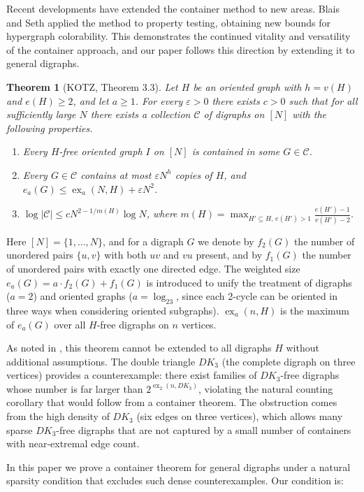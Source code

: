 \documentclass[11pt,a4paper]{article}
\newtheorem{theorem}{Theorem}[section]
\DeclareMathOperator{\ex}{ex}
\newcommand{\cC}{\mathcal{C}}
\newcommand{\eps}{\varepsilon}
\begin{document}
Recent developments have extended the container method to new areas. Blais and Seth \cite{blais2024new} applied the method to property testing, obtaining new bounds for hypergraph colorability. This demonstrates the continued vitality and versatility of the container approach, and our paper follows this direction by extending it to general digraphs.

\begin{theorem}[KOTZ, Theorem 3.3]
Let $H$ be an oriented graph with $h=v(H)$ and $e(H)\ge 2$, and let $a\ge 1$. For every $\eps>0$ there exists $c>0$ such that for all sufficiently large $N$ there exists a collection $\cC$ of digraphs on $[N]$ with the following properties.
\begin{enumerate}
\item[(a)] Every $H$-free oriented graph $I$ on $[N]$ is contained in some $G\in\cC$.
\item[(b)] Every $G\in\cC$ contains at most $\eps N^h$ copies of $H$, and $e_a(G)\le \ex_a(N,H)+\eps N^2$.
\item[(c)] $\log|\cC|\le c N^{2-1/m(H)}\log N$, where $m(H)=\max_{H'\subseteq H,\,e(H')>1}\frac{e(H')-1}{v(H')-2}$.
\end{enumerate}
\end{theorem}

Here $[N]=\{1,\dots,N\}$, and for a digraph $G$ we denote by $f_2(G)$ the number of unordered pairs $\{u,v\}$ with both $uv$ and $vu$ present, and by $f_1(G)$ the number of unordered pairs with exactly one directed edge. The weighted size $e_a(G)=a\cdot f_2(G)+f_1(G)$ is introduced to unify the treatment of digraphs ($a=2$) and oriented graphs ($a=\log_23$, since each 2-cycle can be oriented in three ways when considering oriented subgraphs). $\ex_a(n,H)$ is the maximum of $e_a(G)$ over all $H$-free digraphs on $n$ vertices.

As noted in \cite{KUH2017}, this theorem cannot be extended to all digraphs $H$ without additional assumptions. The double triangle $DK_3$ (the complete digraph on three vertices) provides a counterexample: there exist families of $DK_3$-free digraphs whose number is far larger than $2^{\ex_2(n,DK_3)}$, violating the natural counting corollary that would follow from a container theorem. The obstruction comes from the high density of $DK_3$ (six edges on three vertices), which allows many sparse $DK_3$-free digraphs that are not captured by a small number of containers with near-extremal edge count.

In this paper we prove a container theorem for general digraphs under a natural sparsity condition that excludes such dense counterexamples. Our condition is:
\end{document}
